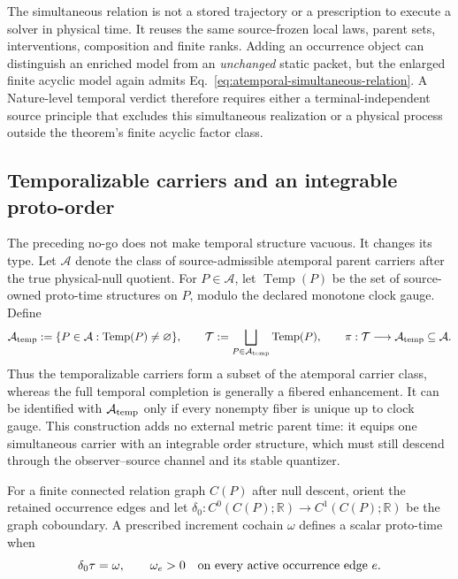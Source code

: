 \documentclass[11pt]{article}
\begin{document}
The simultaneous relation is not a stored trajectory or a prescription to
execute a solver in physical time.  It reuses the same source-frozen local
laws, parent sets, interventions, composition and finite ranks.  Adding an
occurrence object can distinguish an enriched model from an \emph{unchanged}
static packet, but the enlarged finite acyclic model again admits
Eq.~\eqref{eq:atemporal-simultaneous-relation}.  A Nature-level temporal
verdict therefore requires either a terminal-independent source principle
that excludes this simultaneous realization or a physical process outside
the theorem's finite acyclic factor class.

\subsection{Temporalizable carriers and an integrable proto-order}

The preceding no-go does not make temporal structure vacuous.  It changes its
type.  Let $\mathcal A$ denote the class of source-admissible atemporal parent
carriers after the true physical-null quotient.  For $P\in\mathcal A$, let
$\operatorname{Temp}(P)$ be the set of source-owned proto-time structures on
$P$, modulo the declared monotone clock gauge.  Define
\begin{equation}
 \mathcal A_{\rm temp}
 :=\{P\in\mathcal A:\operatorname{Temp}(P)\ne\varnothing\},
 \qquad
 \mathcal T
 :=\bigsqcup_{P\in\mathcal A_{\rm temp}}\operatorname{Temp}(P),
 \qquad
 \pi:\mathcal T\longrightarrow\mathcal A_{\rm temp}\subseteq\mathcal A.
 \label{eq:temporalization-fiber}
\end{equation}
Thus the temporalizable carriers form a subset of the atemporal carrier class,
whereas the full temporal completion is generally a fibered enhancement.  It
can be identified with $\mathcal A_{\rm temp}$ only if every nonempty fiber is
unique up to clock gauge.  This construction adds no external metric parent
time: it equips one simultaneous carrier with an integrable order structure,
which must still descend through the observer--source channel and its stable
quantizer.

For a finite connected relation graph $C(P)$ after null descent, orient the
retained occurrence edges and let
$\delta_0:C^0(C(P);\mathbb R)\to C^1(C(P);\mathbb R)$ be the graph
coboundary.  A prescribed increment cochain $\omega$ defines a scalar
proto-time when
\begin{equation}
 \delta_0\tau=\omega,
 \qquad \omega_e>0
 \quad\hbox{on every active occurrence edge }e.
 \label{eq:proto-time-potential}
\end{equation}
\end{document}
